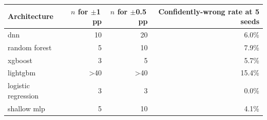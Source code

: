 \begin{tabular}{lrrr}
\hline
Architecture & $n$ for $\pm$1\,pp & $n$ for $\pm$0.5\,pp & Confidently-wrong rate at 5 seeds \\
\hline
dnn & 10 & 20 & 6.0\% \\
random forest & 5 & 10 & 7.9\% \\
xgboost & 3 & 5 & 5.7\% \\
lightgbm & >40 & >40 & 15.4\% \\
logistic regression & 3 & 3 & 0.0\% \\
shallow mlp & 5 & 10 & 4.1\% \\
\hline
\end{tabular}
